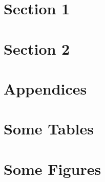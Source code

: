 \section{Section 1} \label{seclong:label3}

\lipsum[1-6]

\section{Section 2} \label{seclong:label2}

\lipsum[1-10]


\newpage
\thispagestyle{empty}
\section*{Appendices}

\begin{subappendices}
    \setcounter{table}{0}
    \renewcommand{\thetable}{A\arabic{table}}
    \setcounter{figure}{0}
    \renewcommand{\thefigure}{A\arabic{figure}}

    \section{Some Tables} \label{app:tables}
    

    \section{Some Figures} \label{app:figures}

    





\end{subappendices}